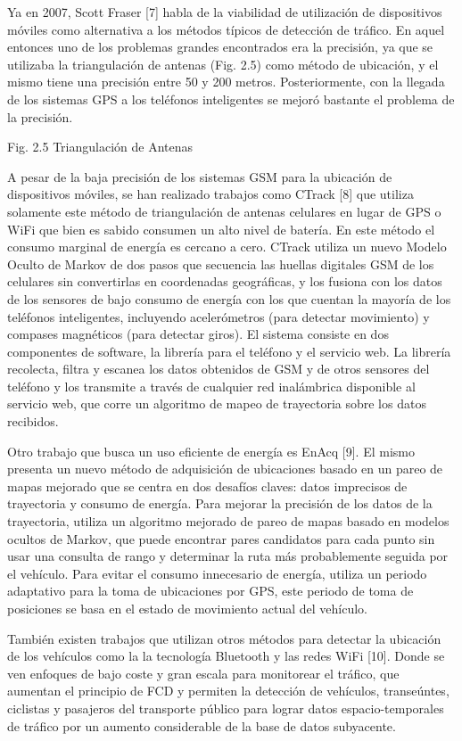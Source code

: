 \documentclass[final,fmstyle]{fpunathesis}
\begin{document}
Ya en 2007, Scott Fraser [7] habla de la viabilidad de utilización de dispositivos móviles como alternativa a los métodos típicos de detección de tráfico. En aquel entonces uno de los problemas grandes encontrados era la precisión, ya que se utilizaba la triangulación de antenas (Fig. 2.5) como método de ubicación, y el mismo tiene una precisión entre 50 y 200 metros. Posteriormente, con la llegada de los sistemas GPS a los teléfonos inteligentes se mejoró bastante el problema de la precisión.

Fig. 2.5 Triangulación de Antenas

A pesar de la baja precisión de los sistemas GSM para la ubicación de dispositivos móviles, se han realizado trabajos como CTrack [8] que utiliza solamente este método de triangulación de antenas celulares en lugar de GPS o WiFi que bien es sabido consumen un alto nivel de batería. En este método el consumo marginal de energía es cercano a cero. CTrack utiliza un nuevo Modelo Oculto de Markov de dos pasos que secuencia las huellas digitales GSM de los celulares sin convertirlas en coordenadas geográficas, y los fusiona con los datos de los sensores de bajo consumo de energía con los que cuentan la mayoría de los teléfonos inteligentes, incluyendo acelerómetros (para detectar movimiento) y compases magnéticos (para detectar giros). El sistema consiste en dos componentes de software, la librería para el teléfono y el servicio web. La librería recolecta, filtra y escanea los datos obtenidos de GSM y de otros sensores del teléfono y los transmite a través de cualquier red inalámbrica disponible al servicio web, que corre un algoritmo de mapeo de trayectoria sobre los datos recibidos.

Otro trabajo que busca un uso eficiente de energía es EnAcq [9]. El mismo presenta un nuevo método de adquisición de ubicaciones basado en un pareo de mapas mejorado que se centra en dos desafíos claves: datos imprecisos de trayectoria y consumo de energía. Para mejorar la precisión de los datos de la trayectoria, utiliza un algoritmo mejorado de pareo de mapas basado en modelos ocultos de Markov, que puede encontrar pares candidatos para cada punto sin usar una consulta de rango y determinar la ruta más probablemente seguida por el vehículo. Para evitar el consumo innecesario de energía, utiliza un periodo adaptativo para la toma de ubicaciones por GPS, este periodo de toma de posiciones se basa en el estado de movimiento actual del vehículo.

También existen trabajos que utilizan otros métodos para detectar la ubicación de los vehículos como la la tecnología Bluetooth y las redes WiFi [10]. Donde se ven enfoques de bajo coste y gran escala para monitorear el tráfico, que aumentan el principio de FCD y permiten la detección de vehículos, transeúntes, ciclistas y pasajeros del transporte público para lograr datos espacio-temporales de tráfico por un aumento considerable de la base de datos subyacente. 
\end{document}
